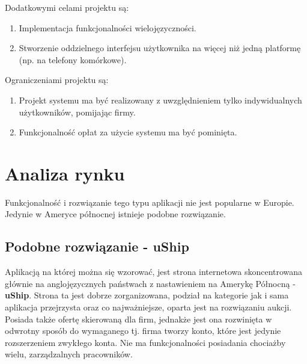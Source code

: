 \documentclass[10pt,titlepage]{article} %
\begin{document}
Dodatkowymi celami projektu są:
\begin{enumerate}[1.]
\item Implementacja funkcjonalności wielojęzyczności.
\item Stworzenie oddzielnego interfejsu użytkownika na więcej niż jedną platformę (np. na telefony komórkowe).
\end{enumerate}

Ograniczeniami projektu są:
\begin{enumerate}[1.]
\item Projekt systemu ma być realizowany z uwzględnieniem tylko indywidualnych użytkowników, pomijając firmy.
\item Funkcjonalność opłat za użycie systemu ma być pominięta.
\end{enumerate}


\newpage
\section{Analiza rynku}
Funkcjonalność i rozwiązanie tego typu aplikacji nie jest popularne w Europie. Jedynie w Ameryce północnej istnieje podobne rozwiązanie.
\subsection{Podobne rozwiązanie - uShip}
Aplikacją na której można się wzorować, jest strona internetowa skoncentrowana głównie na anglojęzycznych państwach z nastawieniem na Amerykę Północną - \textbf{uShip}. Strona ta jest dobrze zorganizowana, podział na kategorie jak i sama aplikacja przejrzysta oraz co najważniejsze, oparta jest na rozwiązaniu aukcji. Posiada także ofertę skierowaną dla firm, jednakże jest ona rozwinięta w odwrotny sposób do wymaganego tj. firma tworzy konto, które jest jedynie rozszerzeniem zwykłego konta. Nie ma funkcjonalności posiadania chociażby wielu, zarządzalnych pracowników.
\end{document}
